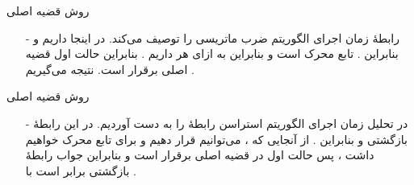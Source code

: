 \begin{frame}{‌روش قضیه اصلی}
\begin{itemize}\itemr
\item[-]
رابطهٔ
زمان اجرای الگوریتم ضرب ماتریسی را توصیف می‌کند. در اینجا داریم
و
بنابراین
.
تابع محرک
 است و بنابراین به ازای هر
داریم
 .
بنابراین حالت اول قضیه اصلی برقرار است. نتیجه می‌گیریم
.
\end{itemize}
\end{frame}


\begin{frame}{‌روش قضیه اصلی}
\begin{itemize}\itemr
\item[-]
در تحلیل زمان اجرای الگوریتم استراسن رابطهٔ
را به دست آوردیم. در این رابطهٔ بازگشتی
و
بنابراین
.
از آنجایی که
، می‌توانیم قرار دهیم
و برای تابع محرک خواهیم داشت
، پس حالت اول در قضیه اصلی برقرار است و بنابراین جواب رابطهٔ بازگشتی برابر است با
.
\end{itemize}
\end{frame}
